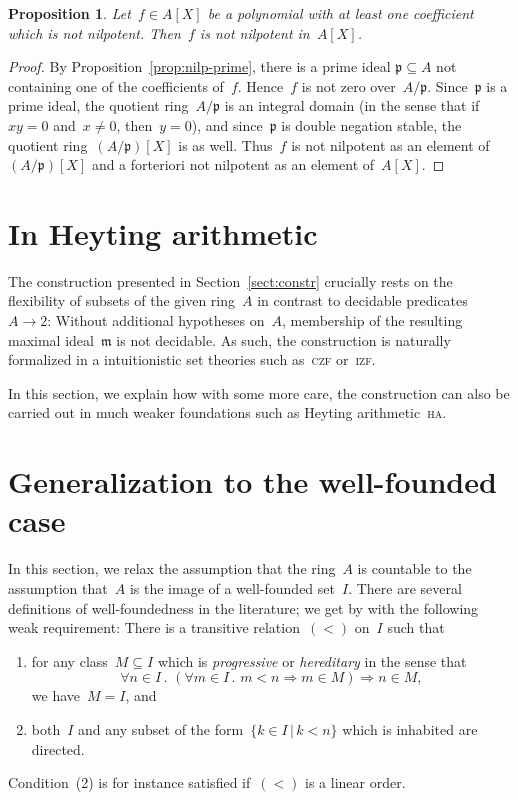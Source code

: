 \documentclass[12pt,oneside,reqno]{amsart}
\theoremstyle{definition}
\theoremstyle{plain}
\newtheorem{prop}[defn]{Proposition}
\theoremstyle{remark}
\newcommand{\mmm}{\mathfrak{m}}
\newcommand{\ppp}{\mathfrak{p}}
\renewcommand{\_}{\mathpunct{.}\,}
\begin{document}
\begin{prop}Let~$f \in A[X]$ be a polynomial with at least one coefficient
which is not nilpotent. Then~$f$ is not nilpotent in~$A[X]$.
\end{prop}

\begin{proof}By Proposition~\ref{prop:nilp-prime}, there is a prime ideal
$\ppp \subseteq A$ not containing one of the coefficients of~$f$. Hence~$f$ is
not zero over~$A/\ppp$. Since~$\ppp$ is a prime ideal, the quotient
ring~$A/\ppp$ is an integral domain (in the sense that if~$xy = 0$ and~$x \neq
0$, then~$y = 0$), and since~$\ppp$ is double negation stable, the quotient ring~$(A/\ppp)[X]$ is as well. Thus~$f$ is not nilpotent
as an element of~$(A/\ppp)[X]$ and a forteriori not nilpotent as an element
of~$A[X]$.\end{proof}


\section{In Heyting arithmetic}

The construction presented in Section~\ref{sect:constr} crucially rests on the
flexibility of subsets of the given ring~$A$ in contrast to decidable
predicates~$A \to 2$: Without additional hypotheses on~$A$, membership of the
resulting maximal ideal~$\mmm$ is not decidable. As such, the construction is
naturally formalized in a intuitionistic set theories such as~\textsc{czf}
or~\textsc{izf}.

In this section, we explain how with some more care, the construction can also
be carried out in much weaker foundations such as Heyting
arithmetic~\textsc{ha}.



\section{Generalization to the well-founded case}

In this section, we relax the assumption that the ring~$A$ is countable to the
assumption that~$A$ is the image of a well-founded set~$I$. There are several
definitions of well-foundedness in the literature; we get by with the following
weak requirement: There is a transitive relation~$({<})$ on~$I$ such that
\begin{enumerate}
\item for any class~$M \subseteq I$ which is \emph{progressive} or
\emph{hereditary} in the sense that
\[ \forall n \in I\_
  (\forall m \in I\_ m < n \Rightarrow m \in M) \Longrightarrow n \in M, \]
we have~$M = I$, and
\item both~$I$ and any subset of the form~$\{k \in I \,|\, k < n\}$ which is
inhabited are directed.
\end{enumerate}
Condition~(2) is for instance satisfied if~$({<})$ is a linear order.
\end{document}
